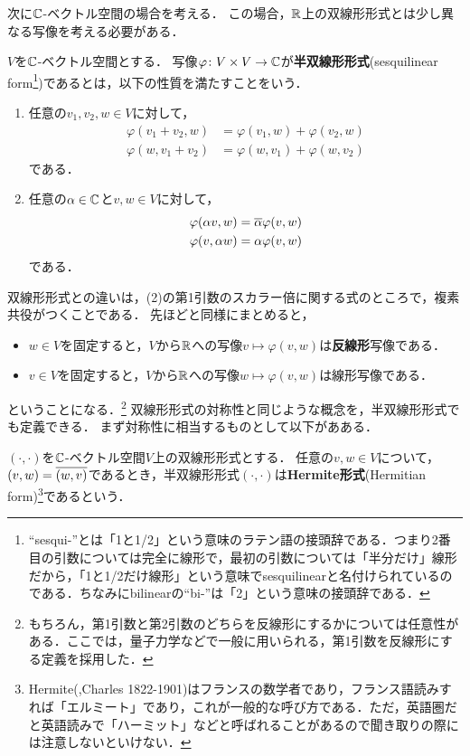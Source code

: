 次に$\mathbb{C}$-ベクトル空間の場合を考える．
この場合，$\mathbb{R}$上の双線形形式とは少し異なる写像を考える必要がある．
\begin{dfn}\label{dfn:sesquilinear}
  $V$を$\mathbb{C}$-ベクトル空間とする．
  写像$\varphi\colon V \times V \to \mathbb{C}$が\textbf{半双線形形式}(sesquilinear form\footnote{``sesqui-''とは「1と1/2」という意味のラテン語の接頭辞である．つまり2番目の引数については完全に線形で，最初の引数については「半分だけ」線形だから，「1と1/2だけ線形」という意味でsesquilinearと名付けられているのである．ちなみにbilinearの``bi-''は「2」という意味の接頭辞である．})であるとは，以下の性質を満たすことをいう．
  \begin{enumerate}
    \item 任意の$v_1,v_2,w\in V$に対して，
    \[
      \begin{aligned}
        \varphi(v_1 + v_2, w) &= \varphi(v_1,w) + \varphi (v_2,w) \\
        \varphi(w, v_1 + v_2) &= \varphi(w,v_1) + \varphi (w,v_2)
      \end{aligned}
    \]
    である．
    \item 任意の$\alpha \in \mathbb{C}$と$v,w\in V$に対して，
    \[
      \begin{aligned}
        \varphi(\alpha v, w) &= \overline{\alpha} \varphi(v,w) \\
        \varphi(v,\alpha w) &= \alpha \varphi(v,w)
      \end{aligned}
    \]
    である．
  \end{enumerate}
\end{dfn}
双線形形式との違いは，(2)の第1引数のスカラー倍に関する式のところで，複素共役がつくことである．
先ほどと同様にまとめると，
\begin{itemize}
  \item $w \in V$を固定すると，$V$から$\mathbb{R}$への写像$v \mapsto \varphi(v,w)$は\textbf{反線形}写像である．
  \item $v \in V$を固定すると，$V$から$\mathbb{R}$への写像$w \mapsto \varphi(v,w)$は線形写像である．
\end{itemize}
ということになる．\footnote{もちろん，第1引数と第2引数のどちらを反線形にするかについては任意性がある．ここでは，量子力学などで一般に用いられる，第1引数を反線形にする定義を採用した．}
双線形形式の対称性と同じような概念を，半双線形形式でも定義できる．
まず対称性に相当するものとして以下があある．
\begin{dfn}
  $(\cdot,\cdot)$を$\mathbb{C}$-ベクトル空間$V$上の双線形形式とする．
  任意の$v,w \in V$について，$(v,w)=\overline{(w,v)}$であるとき，半双線形形式$(\cdot,\cdot)$は\textbf{Hermite形式}(Hermitian form)\footnote{Hermite(,Charles 1822-1901)はフランスの数学者であり，フランス語読みすれば「エルミート」であり，これが一般的な呼び方である．ただ，英語圏だと英語読みで「ハーミット」などと呼ばれることがあるので聞き取りの際には注意しないといけない．}であるという．
\end{dfn}
